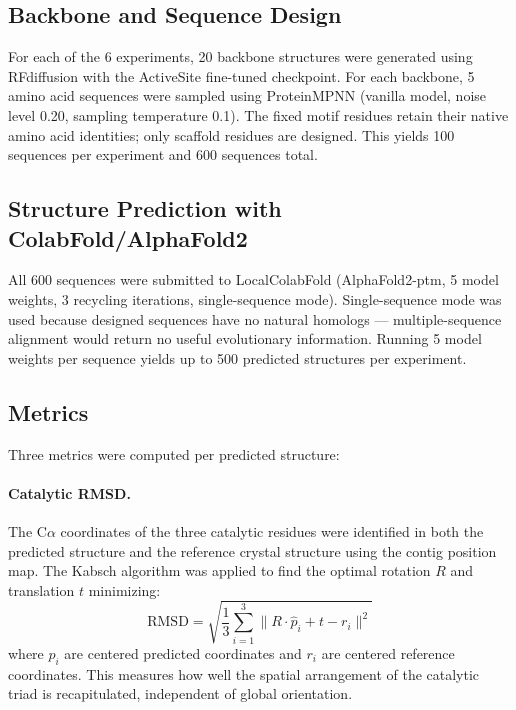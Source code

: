 \documentclass[11pt,letterpaper]{article}
\begin{document}
\subsection{Backbone and Sequence Design}

For each of the 6 experiments, 20 backbone structures were generated using RFdiffusion with the ActiveSite fine-tuned checkpoint. For each backbone, 5 amino acid sequences were sampled using ProteinMPNN (vanilla model, noise level 0.20, sampling temperature 0.1). The fixed motif residues retain their native amino acid identities; only scaffold residues are designed. This yields 100 sequences per experiment and 600 sequences total.

\subsection{Structure Prediction with ColabFold/AlphaFold2}

All 600 sequences were submitted to LocalColabFold (AlphaFold2-ptm, 5 model weights, 3 recycling iterations, single-sequence mode). Single-sequence mode was used because designed sequences have no natural homologs — multiple-sequence alignment would return no useful evolutionary information. Running 5 model weights per sequence yields up to 500 predicted structures per experiment.

\subsection{Metrics}

Three metrics were computed per predicted structure:

\paragraph{Catalytic RMSD.} The C$\alpha$ coordinates of the three catalytic residues were identified in both the predicted structure and the reference crystal structure using the contig position map. The Kabsch algorithm was applied to find the optimal rotation $R$ and translation $t$ minimizing:
\begin{equation}
\text{RMSD} = \sqrt{\frac{1}{3}\sum_{i=1}^{3} \| R \cdot \hat{p}_i + t - r_i \|^2}
\end{equation}
where $\hat{p}_i$ are centered predicted coordinates and $r_i$ are centered reference coordinates. This measures how well the spatial arrangement of the catalytic triad is recapitulated, independent of global orientation.
\end{document}
